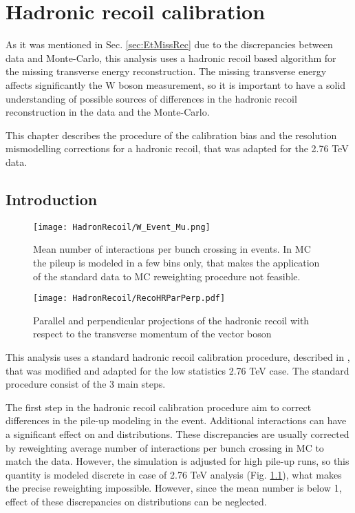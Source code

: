 \chapter{Hadronic recoil calibration}\label{sec:HadrCalib}
\minitoc

As it was mentioned in Sec. \ref{sec:EtMissRec} due to the discrepancies between data and Monte-Carlo, this analysis uses a hadronic recoil based algorithm for the missing transverse energy reconstruction. The missing transverse energy \etmiss affects significantly the W boson measurement, so it is important to have a solid understanding  of possible sources of differences in the hadronic recoil reconstruction in the data and the Monte-Carlo.

 This chapter describes the procedure of the calibration bias and the resolution mismodelling corrections for a hadronic recoil, that was adapted for the 2.76 TeV data. 

\section{Introduction}

\begin{figure}[!bp]
\centering
\texttt{[image: HadronRecoil/W\_Event\_Mu.png]}
\caption{Mean number of interactions per bunch crossing in \wenu events. In MC the pileup is modeled in a few bins only, that makes the application of the standard data to MC reweighting procedure not feasible.}
\label{HadrRecoil:mu}
\end{figure} 

\begin{figure}[!tbp]
\begin{center}
\begin{minipage}[h]{0.49\linewidth}
\texttt{[image: HadronRecoil/RecoHRParPerp.pdf]}
\end{minipage}
\caption{Parallel and perpendicular projections of the hadronic recoil with respect to the transverse momentum of the vector boson \cite{HRPlots}}
\label{ris:HadrRecoilTruthPt}
\end{center}
\end{figure}

This analysis uses a standard hadronic recoil calibration procedure, described in \cite{HRCorrections}, that was modified and adapted for the low statistics 2.76 TeV case. The standard procedure consist of the 3 main steps. 

The first step in the hadronic recoil calibration procedure aim to correct differences in the pile-up modeling in the event. Additional interactions can have a significant effect on \etmiss and \sumet distributions. These discrepancies are usually corrected by reweighting average number of interactions per bunch crossing in MC to match the data. However, the \atlas simulation is adjusted for high pile-up runs, so this quantity is modeled discrete in case of 2.76 TeV analysis (Fig. \ref{HadrRecoil:mu}), what makes the precise reweighting impossible. However, since the mean number is below 1, effect of these discrepancies on \etmiss distributions can be neglected. 


